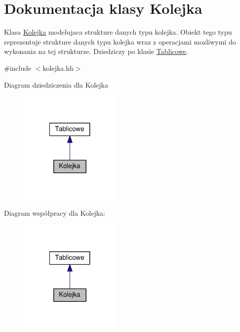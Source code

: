 \hypertarget{class_kolejka}{\section{Dokumentacja klasy Kolejka}
\label{class_kolejka}
}


Klasa \hyperlink{class_kolejka}{Kolejka} modelujaca strukture danych typu kolejka. Obiekt tego typu reprezentuje strukture danych typu kolejka wraz z operacjami mozliwymi do wykonania na tej strukturze. Dziedziczy po klasie \hyperlink{class_tablicowe}{Tablicowe}.  




{\ttfamily \#include $<$kolejka.\-hh$>$}



Diagram dziedziczenia dla Kolejka\nopagebreak
\begin{figure}[H]
\begin{center}
\leavevmode
\includegraphics[width=140pt]{class_kolejka__inherit__graph}
\end{center}
\end{figure}


Diagram współpracy dla Kolejka\-:\nopagebreak
\begin{figure}[H]
\begin{center}
\leavevmode
\includegraphics[width=140pt]{class_kolejka__coll__graph}
\end{center}
\end{figure}
